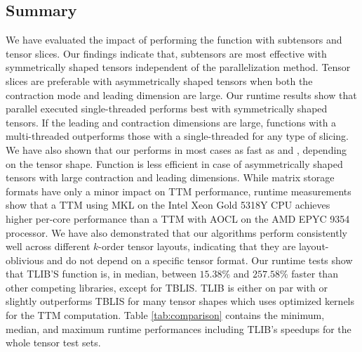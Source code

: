 \subsection{Summary}
We have evaluated the impact of performing the  function with subtensors and tensor slices.
Our findings indicate that, subtensors are most effective with symmetrically shaped tensors independent of the parallelization method. 
Tensor slices are preferable with asymmetrically shaped tensors when both the contraction mode and leading dimension are large.
Our runtime results show that parallel executed single-threaded  performs best with symmetrically shaped tensors.
If the leading and contraction dimensions are large, functions with a multi-threaded  outperforms those with a single-threaded  for any type of slicing.
We have also shown that our  performs in most cases as fast as  and , depending on the tensor shape.
Function  is less efficient in case of asymmetrically shaped tensors with large contraction and leading dimensions.
While matrix storage formats have only a minor impact on TTM performance, runtime measurements show that a TTM using MKL on the Intel Xeon Gold 5318Y CPU achieves higher per-core performance than a TTM with AOCL on the AMD EPYC 9354 processor.
We have also demonstrated that our algorithms perform consistently well across different $k$-order tensor layouts, indicating that they are layout-oblivious and do not depend on a specific tensor format.
Our runtime tests show that TLIB'S function  is, in median, between $15.38$\% and $257.58$\% faster than other competing libraries, except for TBLIS.
TLIB is either on par with or slightly outperforms TBLIS for many tensor shapes which uses optimized kernels for the TTM computation.
Table \ref{tab:comparison} contains the minimum, median, and maximum runtime performances including TLIB's speedups for the whole tensor test sets.

